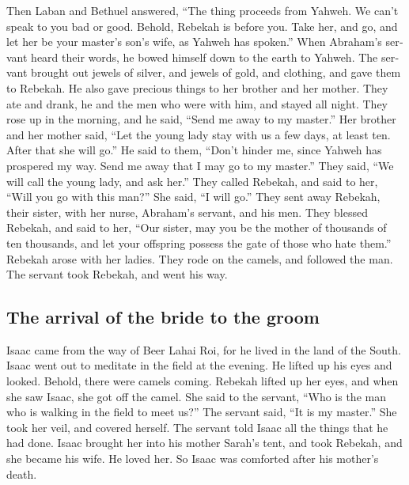 \begin{paracol}{2}
\begin{otherlanguage}{english}
 Then Laban and Bethuel answered, ``The thing proceeds
from Yahweh. We can't speak to you bad or good.  Behold,
Rebekah is before you. Take her, and go, and let her be your master's
son's wife, as Yahweh has spoken.''  When Abraham's
servant heard their words, he bowed himself down to the earth to Yahweh.
 The servant brought out jewels of silver, and jewels of
gold, and clothing, and gave them to Rebekah. He also gave precious
things to her brother and her mother.  They ate and
drank, he and the men who were with him, and stayed all night. They rose
up in the morning, and he said, ``Send me away to my master.''
 Her brother and her mother said, ``Let the young lady
stay with us a few days, at least ten. After that she will go.''
 He said to them, ``Don't hinder me, since Yahweh has
prospered my way. Send me away that I may go to my master.''
 They said, ``We will call the young lady, and ask her.''
 They called Rebekah, and said to her, ``Will you go with
this man?'' She said, ``I will go.''  They sent away
Rebekah, their sister, with her nurse, Abraham's servant, and his men.
 They blessed Rebekah, and said to her, ``Our sister, may
you be the mother of thousands of ten thousands, and let your offspring
possess the gate of those who hate them.''  Rebekah arose
with her ladies. They rode on the camels, and followed the man. The
servant took Rebekah, and went his way.

\hypertarget{the-arrival-of-the-bride-to-the-groom}{%
\subsection{The arrival of the bride to the
groom}\label{the-arrival-of-the-bride-to-the-groom}}

 Isaac came from the way of Beer Lahai Roi, for he lived
in the land of the South.  Isaac went out to meditate in
the field at the evening. He lifted up his eyes and looked. Behold,
there were camels coming.  Rebekah lifted up her eyes,
and when she saw Isaac, she got off the camel.  She said
to the servant, ``Who is the man who is walking in the field to meet
us?'' The servant said, ``It is my master.'' She took her veil, and
covered herself.  The servant told Isaac all the things
that he had done.  Isaac brought her into his mother
Sarah's tent, and took Rebekah, and she became his wife. He loved her.
So Isaac was comforted after his mother's death.


\end{otherlanguage}
\end{paracol}

